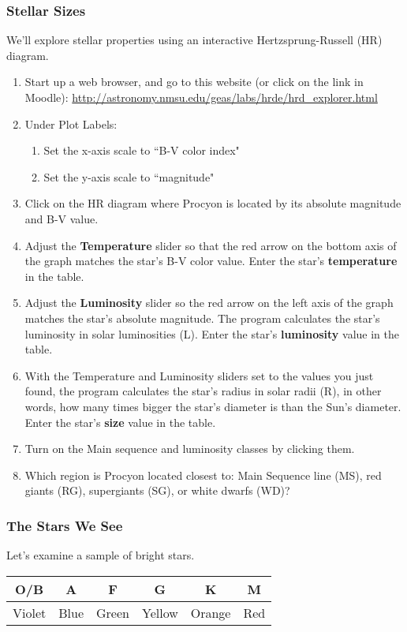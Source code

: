 \documentclass[main.tex]{subfiles}
\begin{document}
\subsubsection{Stellar Sizes}
We'll explore stellar properties using an interactive Hertzsprung-Russell (HR) diagram.
\begin{enumerate}
\item Start up a web browser, and go to this website (or click on the link in Moodle): \url{http://astronomy.nmsu.edu/geas/labs/hrde/hrd_explorer.html}
\item Under Plot Labels:
	\begin{enumerate}
	\item Set the x-axis scale to ``B-V color index"
	\item Set the y-axis scale to ``magnitude"
	\end{enumerate}
\item Click on the HR diagram where Procyon is located by its absolute magnitude and B-V value.
\item Adjust the \textbf{Temperature} slider so that the red arrow on the bottom axis of the graph matches the star's B-V color value. Enter the star's \textbf{temperature} in the table.
\item Adjust the \textbf{Luminosity} slider so the red arrow on the left axis of the graph matches the star's absolute magnitude. The program calculates the star's luminosity in solar luminosities (L). Enter the star's \textbf{luminosity} value in the table. 
\item With the Temperature and Luminosity sliders set to the values you just found, the program calculates the star's radius in solar radii (R), in other words, how many times bigger the star's diameter is than the Sun's diameter. Enter the star's \textbf{size} value in the table.
\item Turn on the Main sequence and luminosity classes by clicking them.
\item Which region is Procyon located closest to: Main Sequence line (MS), red giants (RG), supergiants (SG), or white dwarfs (WD)?
\end{enumerate}

\subsubsection{The Stars We See}
Let's examine a sample of bright stars.

\begin{table}[htbp]
\begin{center}
\begin{tabular}{|c|c|c|c|c|c|}\hline
O/B & A & F & G & K & M \\\hline
Violet & Blue & Green & Yellow & Orange & Red \\\hline
\end{tabular}
\end{center}
\label{tab:col}
\end{table}
\vspace{-30pt}
\end{document}
